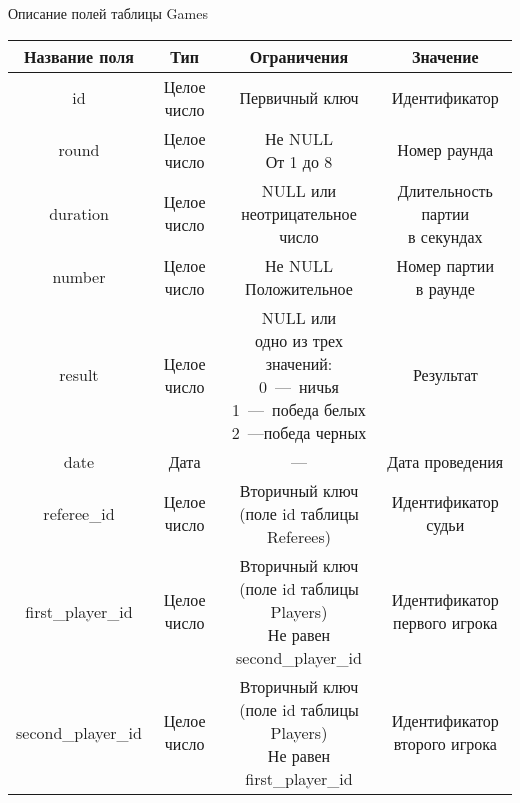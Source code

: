 \begin{center}
	\begin{threeparttable}
		\captionsetup{justification=raggedright,singlelinecheck=off}
		\caption{\label{games_table}Описание полей таблицы Games}
		\centering
		\begin{tabular}{|c|c|c|c|}
			\hline
			Название поля & Тип & Ограничения & Значение \\
			\hline
			id & Целое число & Первичный ключ & Идентификатор \\
			\hline
			round & Целое число & \specialcell{Не NULL\\От 1 до 8} & Номер раунда \\
			\hline
			duration & Целое число & \specialcell{NULL или\\неотрицательное число} & \specialcell{Длительность партии\\в секундах} \\
			\hline
			number & Целое число & \specialcell{Не NULL\\Положительное} & \specialcell{Номер партии\\в раунде} \\
			\hline
			result & Целое число & \specialcell{NULL или\\одно из трех\\значений:\\0~---~ничья\\1~---~победа белых\\2~---победа черных} & Результат \\
			\hline
			date & Дата & --- & Дата проведения \\
			\hline
			referee\_id & Целое число & \specialcell{Вторичный ключ\\(поле id таблицы Referees)} & \specialcell{Идентификатор\\судьи}\\
			\hline
			first\_player\_id & Целое число & \specialcell{Вторичный ключ\\(поле id таблицы Players)\\Не равен second\_player\_id} & \specialcell{Идентификатор\\первого игрока}\\
			\hline
			second\_player\_id & Целое число & \specialcell{Вторичный ключ\\(поле id таблицы Players)\\Не равен first\_player\_id} & \specialcell{Идентификатор\\второго игрока}\\
			\hline
		\end{tabular}
	\end{threeparttable}
\end{center}
